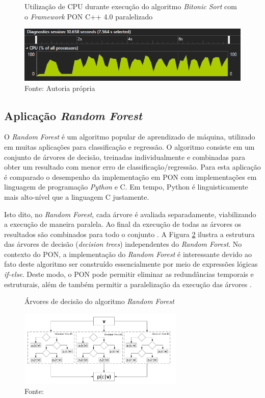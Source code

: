 \begin{figure}[!htb]
\centering
\caption{Utilização de CPU durante execução do algoritmo \textit{Bitonic Sort}
com o \textit{Framework} PON C++ 4.0 paralelizado}
\includegraphics[width=\textwidth]{../figures/cpu_bitonic_par.png}
\smallskip
\caption*{Fonte: Autoria própria}
\label{fig:bit_cpu_par}
\end{figure}

\subsection{Aplicação \textit{Random Forest}}\label{sec:random_forest}

O \textit{Random Forest} é um algoritmo popular de aprendizado de máquina,
utilizado em muitas aplicações para classificação e regressão. O algoritmo
consiste em um conjunto de árvores de decisão, treinadas individualmente e
combinadas para obter um resultado com menor erro de classificação/regressão.
Para esta aplicação é comparado o desempenho da implementação em PON com
implementações em linguagem de programação \textit{Python} e C. Em tempo, Python
é linguisticamente mais alto-nível que a linguagem C justamente.

Isto dito, no \textit{Random Forest}, cada árvore é avaliada separadamente,
viabilizando a execução de maneira paralela. Ao final da execução de todas as
árvores os resultados são combinados para todo o conjunto \cite{criminisi_2011}.
A Figura \ref{fig:random_forest} ilustra a estrutura das árvores de decisão
(\textit{decision trees}) independentes do \textit{Random Forest}. No contexto
do PON, a implementação do \textit{Random Forest} é interessante devido ao fato
deste algoritmo ser construído essencialmente por meio de expressões lógicas
\textit{if-else}. Deste modo, o PON pode permitir eliminar as redundâncias
temporais e estruturais, além de também permitir a paralelização da execução das
árvores \cite{quali_pordeus_2020}.

\begin{figure}[!htb]
  \centering
  \caption{Árvores de decisão do algoritmo \textit{Random Forest}}
  \includegraphics[width=0.7\textwidth]{../figures/random_forest.png}
  \smallskip
  \caption*{Fonte: }
  \label{fig:random_forest}
  \end{figure}

